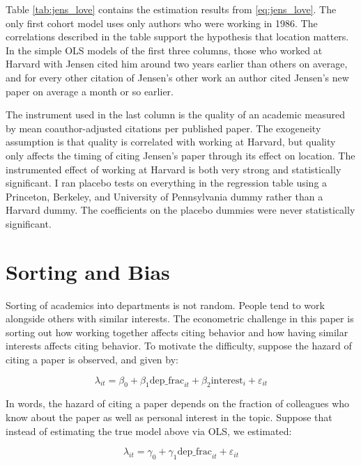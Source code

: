 Table \ref{tab:jens_love} contains the estimation results from \eqref{eq:jens_love}.
The only first cohort model uses only authors who were working in 1986.  The
correlations described in the table support the hypothesis that location matters.
In the simple OLS models of the first three columns, those who worked at
Harvard with Jensen cited him around two years earlier than others on
average, and for every other citation of Jensen's other work an author
cited Jensen's new paper on average a month or so earlier.

The instrument used in the last column is the quality of an academic measured by
mean coauthor-adjusted citations per published paper. The exogeneity
assumption is that quality is correlated with working at Harvard, but
quality only affects the timing of citing Jensen's paper through its
effect on location. The instrumented effect of working at Harvard is
both very strong and statistically significant. I ran placebo tests on
everything in the regression table using a Princeton, Berkeley, and
University of Pennsylvania dummy rather than a Harvard dummy. The
coefficients on the placebo dummies were never statistically
significant.

\clearpage
\section{Sorting and Bias}
\label{sec:sortbias}

Sorting of academics into departments is not random. People tend to work
alongside others with similar interests. The econometric challenge in
this paper is sorting out how working together affects citing behavior
and how having similar interests affects citing behavior. To motivate
the difficulty, suppose the hazard of citing a paper is observed, and
given by:

\begin{equation}
\lambda_{it} = \beta_0 + \beta_1 \mbox{dep\_frac}_{it} + \beta_2 \mbox{interest}_i + \varepsilon_{it}
\end{equation}

In words, the hazard of citing a paper depends on the fraction of
colleagues who know about the paper as well as personal interest in the
topic. Suppose that instead of estimating the true model above via OLS,
we estimated:

\begin{equation}
\lambda_{it} = \gamma_0 + \gamma_1 \mbox{dep\_frac}_{it} + \varepsilon_{it}
\end{equation}

